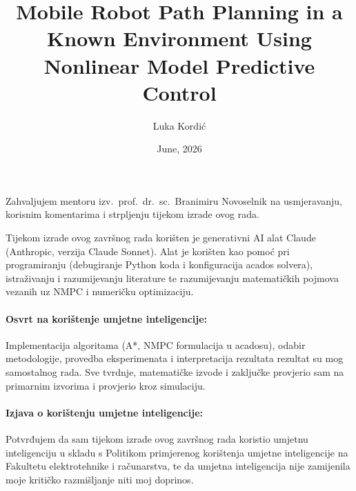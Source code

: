 \documentclass[zavrsnirad]{fer}
\title{Mobile Robot Path Planning in a Known Environment Using Nonlinear Model Predictive Control}
\author{Luka Kordić}
\date{June, 2026}
\begin{document}
\maketitle


\begin{zahvale}
Zahvaljujem mentoru izv.~prof.~dr.~sc.~Branimiru Novoselnik na usmjeravanju, korisnim komentarima i strpljenju tijekom izrade ovog rada.
\end{zahvale}

\mainmatter

\tableofcontents

















\begin{izjavaoui}

Tijekom izrade ovog završnog rada korišten je generativni AI alat Claude (Anthropic, verzija Claude Sonnet). Alat je korišten kao pomoć pri programiranju (debugiranje Python koda i konfiguracija acados solvera), istraživanju i razumijevanju literature te razumijevanju matematičkih pojmova vezanih uz NMPC i numeričku optimizaciju.

\paragraph{Osvrt na korištenje umjetne inteligencije:}
Implementacija algoritama (A*, NMPC formulacija u acadosu), odabir metodologije, provedba eksperimenata i interpretacija rezultata rezultat su mog samostalnog rada. Sve tvrdnje, matematičke izvode i zaključke provjerio sam na primarnim izvorima i provjerio kroz simulaciju.
\paragraph{Izjava o korištenju umjetne inteligencije:}
Potvrđujem da sam tijekom izrade ovog završnog rada koristio umjetnu inteligenciju u skladu s Politikom primjerenog korištenja umjetne inteligencije na Fakultetu elektrotehnike i računarstva, te da umjetna inteligencija nije zamijenila moje kritičko razmišljanje niti moj doprinos.

\end{izjavaoui}
\end{document}
